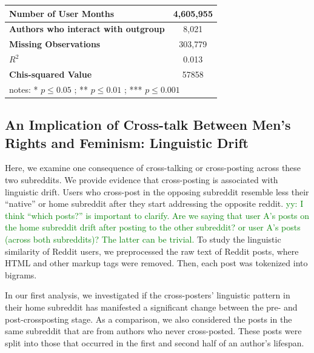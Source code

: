 \documentclass[letterpaper]{article}
\newcommand{\yy}[1]{{\textcolor{green}{yy: #1}}}
\begin{document}
\begin{table}[htb]
\begin{threeparttable}
\begin{adjustbox}{max width=\columnwidth}
\begin{tabular}{|p{4cm}|c|r|r|r|}
    \textbf{Number of User Months} & \multicolumn{4}{c|}{4,605,955} \\\hline
    
    \textbf{Authors who interact
 with outgroup} & \multicolumn{4}{c|}{8,021} \\\hline
    
    \textbf{Missing Observations} & \multicolumn{4}{c|}{303,779} \\\hline
    
    \textbf{$R^2$} & \multicolumn{4}{c|}{0.013} \\\hline
    
    \textbf{Chis-squared Value} & \multicolumn{4}{c|}{57858} \\
    \hline
    \multicolumn{5}{l}{notes: * $p \leq 0.05$ ; ** $p \leq 0.01$ ; *** $p \leq 0.001$}{}\\
    \end{tabular}%

\end{adjustbox}
\end{threeparttable}
\label{tab:regrtab3}
\end{table}

\subsection{An Implication of Cross-talk Between Men's Rights and Feminism: Linguistic Drift}

Here, we examine one consequence of cross-talking or cross-posting across these two subreddits. We provide evidence that cross-posting is associated with linguistic drift. Users who cross-post in the opposing subreddit resemble less their ``native'' or home subreddit after they start addressing the opposite reddit. \yy{I think ``which posts?'' is important to clarify. Are we saying that user A's posts on the home subreddit drift after posting to the other subreddit? or user A's posts (across both subreddits)? The latter can be trivial. }  To study the linguistic similarity of Reddit users, we preprocessed the raw text of Reddit posts, where HTML and other markup tags were removed. Then, each post was tokenized into bigrams. 

In our first analysis, we investigated if the cross-posters' linguistic pattern in their home subreddit has manifested a significant change between the pre- and post-crossposting stage. As a comparison, we also considered the posts in the same subreddit that are from authors who never cross-posted. These posts were split into those that occurred in the first and second half of an author's lifespan.
\end{document}
